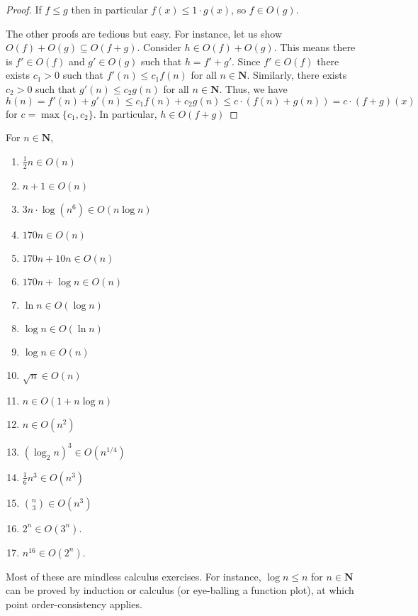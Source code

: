 \documentclass{tstextbook}
\begin{document}
\begin{proof}
  If $f\leq g$ then in particular $f(x)\leq 1\cdot g(x)$, so $f\in O(g)$.

  The other proofs are tedious but easy.
  For instance, let us show  $O(f)+ O( g) \subseteq O(f + g)$.
  Consider $h\in O(f) + O(g)$.
  This means there is $f'\in O(f)$ and $g'\in O(g)$ such that $h=f'+g'$.
  Since $f'\in O(f)$ there exists $c_1>0$ such that $f'(n)\leq c_1 f(n)$ for all $n\in \mathbf N$.
  Similarly,  there exists $c_2>0$ such that $g'(n)\leq c_2g(n)$ for all $n\in \mathbf N$.
  Thus, we have $h(n) = f'(n) + g'(n) \leq c_1f(n) + c_2 g(n) \leq c\cdot (f(n) + g(n)) = c\cdot (f+g)(x)$ for $c=\max\{c_1,c_2\}$.
  In particular, $h\in O(f + g)$
\end{proof}

\begin{example}
  For $n\in\mathbf N$,
  \begin{enumerate}
    \item $\frac12 n \in O(n)$
    \item $n + 1\in O(n)$
    \item $3n \cdot \log ( n^6) \in O(n\log n)$
    \item $170 n \in O(n)$
    \item $170 n + 10 n \in O(n)$
    \item $170 n + \log n \in O(n)$
    \item $\ln n \in O(\log n)$
    \item $\log n \in O(\ln n)$
    \item $\log n \in O(n)$
    \item $\sqrt n \in O(n)$
    \item $n \in O(1 + n\log n)$
    \item $n \in O(n^2)$
    \item $(\log_2 n)^3 \in O(n^{1/4})$
    \item $\frac16 n^3 \in O(n^3)$
    \item $\binom{n}{3} \in O(n^3)$
    \item $2^n \in O(3^n)$.
    \item $n^{16} \in O(2^n)$.
  \end{enumerate}

  Most of these are mindless calculus exercises.
  For instance, $\log n \leq n$ for $n\in\mathbf N$ can be proved by induction or calculus (or eye-balling a function plot), at which point order-consistency applies.
\end{example}
\end{document}
